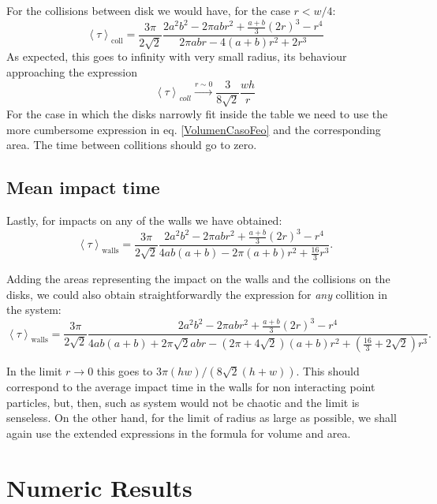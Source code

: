 \documentclass[letterpaper,10pt, jcp, aps]{revtex4-1}
\newcommand{\mean}[1]{\left \langle #1 \right \rangle}
\begin{document}
For the collisions between disk we would have, for the case $r<w/4$:
\begin{equation}\label{colltau}
 \mean{\tau}_\text{coll} = 	
\frac{3 \pi}{2\sqrt{2}}
\frac {2 a^{2} b^{2}  - 2 \pi a b r^{2} + \textstyle \frac{a+b}{3}  (2r)^{3}  -  r^4}
{2\pi a b r -4(a+b)r^2+2r^3}
\end{equation}
As expected, this goes to infinity with very small radius, its behaviour
approaching the expression
\begin{equation}\label{colltaulim0}
\mean{\tau}_{coll}  \xrightarrow{r\sim 0} 
\frac{3}{8\sqrt{2}}\frac{wh}{r}
\end{equation}
For the case in which the disks narrowly fit inside the table we need to
use the more cumbersome expression in eq. \ref{VolumenCasoFeo} and
the corresponding area. The time between collitions should go to zero.


\subsection{Mean impact time}

Lastly, for impacts on any of the walls we have obtained: 
\begin{equation}\label{impactwall}
 \mean{\tau}_\text{walls} = 	
\frac{3 \pi}{2\sqrt{2}}
\frac { 2a^{2} b^{2}  -  2\pi a b r^{2} + \frac{a+b}{3}(2r)^3 - r^4}
{4ab(a+b)-2\pi(a+b) r^2 + \frac{16}{3} r^3 }.
\end{equation}

Adding the areas representing the impact on the walls and
the collisions on the disks, we could also obtain
straightforwardly the expression for \emph{any} 
collition in the system:
\begin{equation}\label{impactwall}
 \mean{\tau}_\text{walls} = 	
\frac{3 \pi}{2\sqrt{2}}
\frac { 2a^{2} b^{2}  -  2\pi a b r^{2} + \frac{a+b}{3}(2r)^3 - r^4}
{4ab(a+b)+2 \pi \sqrt{2} abr-(2\pi+4\sqrt{2})(a+b)r^2+(\frac{16}{3}+2\sqrt{2})r^3}.
\end{equation}

In the limit $r\rightarrow 0$ this goes to $3 \pi (hw)/(8\sqrt{2}(h+w))$.
This should correspond to the average impact time in the walls
for non interacting point particles, 
but, then, such as system would not be chaotic and the limit is senseless.
On the other hand, for the limit of radius as large as possible, we shall
again use the extended expressions in the formula for volume and area.


\section{Numeric Results}
\end{document}
